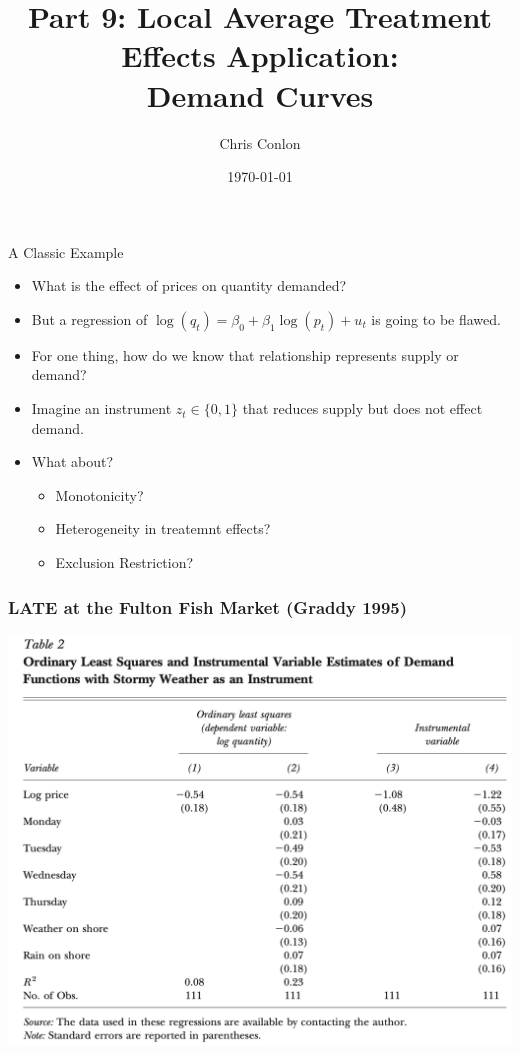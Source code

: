 \documentclass[xcolor=pdftex,dvipsnames,table,mathserif,aspectratio=169]{beamer}
\begin{document}
\title{Part 9: Local Average Treatment Effects Application:\\
 Demand Curves}
\author{Chris Conlon}
\date{\today}

\frame{\titlepage}




\begin{frame}{A Classic Example}
\begin{itemize}
\item What is the effect of prices on quantity demanded?
\item But a regression of $\log(q_t)  = \beta_0 + \beta_1 \log(p_t) + u_t$ is going to be flawed.
\item For one thing, how do we know that relationship represents supply or demand?
\item Imagine an instrument $z_t \in \{0,1\}$ that reduces supply but does not effect demand.
\item What about?
\begin{itemize}
\item Monotonicity?
\item Heterogeneity in treatemnt effects?
\item Exclusion Restriction?
\end{itemize}
\end{itemize}
\end{frame}


\begin{frame}
\frametitle{LATE at the Fulton Fish Market (Graddy 1995)}
\begin{center}
\includegraphics[width=\textheight]{./resources/graddy}
\end{center}
\end{frame}
\end{document}
